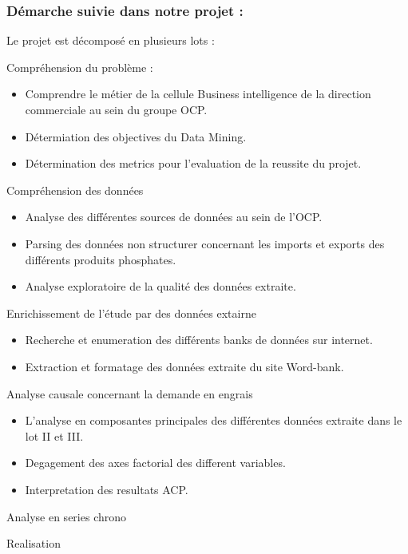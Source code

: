 	\subsubsection{Démarche suivie dans notre projet :}
	Le projet est décomposé en plusieurs lots :
	\begin{description}[align=left]
		\item[Lot I :] Compréhension du problème :
						\begin{itemize}
							\item Comprendre le métier de la cellule Business intelligence de la direction commerciale au sein du groupe OCP.
							\item Détermiation des objectives du Data Mining.
							\item Détermination des metrics pour l'evaluation de la reussite du projet.
					   	\end{itemize}
		\item[Lot II :] Compréhension des données
						\begin{itemize}
							\item Analyse des différentes sources de données au sein de l'OCP.
							\item Parsing des données non structurer concernant les imports et exports des différents produits phosphates.
							\item Analyse exploratoire de la qualité des données extraite.
						\end{itemize}		 %
		\item[Lot III :] Enrichissement de l'étude par des données extairne
						\begin{itemize}
							\item Recherche et enumeration des différents banks de données sur internet.
							\item Extraction et formatage des données extraite du site Word-bank.
						\end{itemize} %
		\item[Lot IV :] Analyse causale concernant la demande en engrais
						\begin{itemize}
							\item L'analyse en composantes principales des différentes données extraite dans le lot II et III.
							\item Degagement des axes factorial des different variables.
							\item Interpretation des resultats ACP.
						\end{itemize} %
		\item[Lot V :] Analyse en series chrono
		\item[Lot VI :] Realisation
	\end{description}